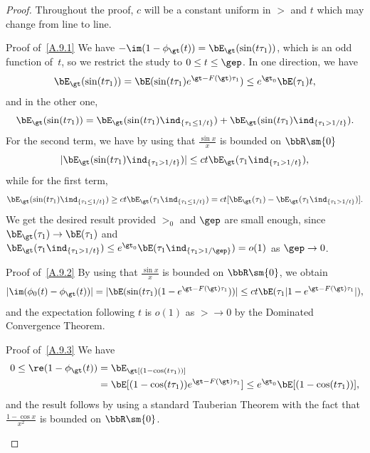 \begin{proof}
Throughout the proof, $c$ will be a constant uniform in $\gt$ and $t$ which may change from line to line.

\begin{step}{Proof of~\eqref{A.9.1}}
We have $-\im(1- \phi_\gt(t)) = \bE_\gt (\sin(t\tau_1))$, which is an odd function of~$t$, so we restrict the study to $0\le t\le \gep$. In one direction, we have
\begin{equation}
\bE_\gt (\sin(t\tau_1)) = \bE(\sin(t\tau_1)e^{\gt - F(\gt)\tau_1}) \le e^{\gt_0}\bE(\tau_1) t,
\end{equation}
and in the other one,
\begin{equation}
\bE_\gt (\sin(t\tau_1)) = \bE_\gt (\sin(t\tau_1)\ind_{\{\tau_1 \le 1/t\}}) + \bE_\gt (\sin(t\tau_1)\ind_{\{\tau_1 > 1/t\}}).
\end{equation}
For the second term, we have by using that $\frac{\sin x}{x}$ is bounded on $\bbR\sm\{0\}$
\begin{equation}
|\bE_\gt (\sin(t\tau_1)\ind_{\{\tau_1 > 1/t\}})| \le ct\bE_\gt(\tau_1 \ind_{\{\tau_1 > 1/t\}}),
\end{equation}
while for the first term,
\begin{equation}
\bE_\gt (\sin(t\tau_1)\ind_{\{\tau_1 \le 1/t\}}) \ge ct \bE_\gt(\tau_1 \ind_{\{\tau_1 \le 1/t\}}) = ct [\bE_\gt(\tau_1) - \bE_\gt(\tau_1 \ind_{\{\tau_1 > 1/t\}})].
\end{equation}
We get the desired result provided $\gt_0$ and $\gep$ are small enough, since $\bE_\gt(\tau_1) \to \bE(\tau_1)$ and $\bE_\gt(\tau_1 \ind_{\{\tau_1 > 1/t\}}) \le e^{\gt_0} \bE(\tau_1 \ind_{\{\tau_1 > 1/\gep\}}) = o(1)$ as $\gep\to 0$.
\end{step}

\begin{step}{Proof of~\eqref{A.9.2}}
By using that $\frac{\sin x}{x}$ is bounded on $\bbR\sm\{0\}$, we obtain
\begin{equation}
|{\im(\phi_0(t) -\phi_\gt(t))}| = | \bE(\sin(t\tau_1) (1-e^{\gt - F(\gt)\tau_1})) | \le ct \bE(\tau_1|1-e^{\gt - F(\gt)\tau_1}|),
\end{equation} and the expectation following $t$ is $o(1)$ as $\gt\to 0$ by the Dominated Convergence Theorem.
\end{step}

\begin{step}{Proof of~\eqref{A.9.3}}
We have
\begin{equation}
\begin{aligned}
0 \le \re(1- \phi_\gt(t)) &= \bE_\gt[(1-\cos(t\tau_1))]\\
&= \bE[(1-\cos(t\tau_1))e^{\gt-F(\gt)\tau_1}] \le e^{\gt_0} \bE[(1-\cos(t\tau_1))],
\end{aligned}
\end{equation} and the result follows by using a standard Tauberian Theorem with the fact that $\frac{1-\cos x}{x^2}$ is bounded on $\bbR\sm\{0\}$.
\end{step}


\end{proof}
